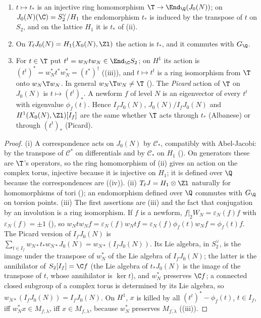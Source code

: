 \begin{proposition}\label{prop:moddeg:hecke-on-j0}
\leavevmode
\begin{enumerate}[label=(\roman*)]
\item $t\mapsto t_*$ is an injective ring homomorphism $\T\to\End_\Q(J_0(N))$; on $J_0(N)(\C)=S_2^\vee/H_1$ the endomorphism $t_*$ is induced by the transpose of $t$ on $S_2$, and on the
lattice $H_1$ it is $t_*$ of (ii).
\item On $T_\ell J_0(N)=H_1(X_0(N),\Zl)$ the action is $t_*$, and it commutes with $G_\Q$.
\item For $t\in\T$ put $t^t=w_Ntw_N\in\End_\C S_2$; on $H^1$ its action is $(t^t)^*=w_N^*t^*w_N^*=(t^*)^\dagger$ ((iii)), and $t\mapsto t^t$ is a ring isomorphism from
$\T$ onto $w_N\T w_N$. In general $w_N\T w_N\ne\T$ (). The \emph{Picard} action of $\T$ on $J_0(N)$ is $t\mapsto(t^t)_*$. A newform $f$ of level $N$ is an eigenvector of
every $t^t$ with eigenvalue $\phi_f(t)$. Hence $I_fJ_0(N)$, $J_0(N)/I_fJ_0(N)$ and $H^1(X_0(N),\Zl)[I_f]$ are the same whether $\T$ acts through $t_*$ (Albanese) or through $(t^t)_*$
(Picard).
\end{enumerate}
\end{proposition}

\begin{proof}
(i) A correspondence acts on $J_0(N)$ by $\mathcal C_*$, compatibly with Abel-Jacobi: by the transpose of $\mathcal C^*$ on differentials and by $\mathcal C_*$ on $H_1$
(). On generators these are $\T$'s operators, so the ring homomorphism of (ii) gives an action on the complex torus,
injective because it is injective on $H_1$; it is defined over $\Q$ because the correspondences are ((iv)). (ii) $T_\ell J=H_1\otimes\Zl$
naturally for homomorphisms of tori (); an endomorphism defined over $\Q$ commutes with $G_\Q$ on torsion points. (iii) The first assertions are (iii) and the fact that conjugation by an involution is a ring isomorphism. If $f$ is a newform, $f|_2W_N=\varepsilon_N(f)f$
with $\varepsilon_N(f)=\pm1$ (), so $w_Ntw_Nf=\varepsilon_N(f)w_Ntf=\varepsilon_N(f)\phi_f(t)w_Nf=\phi_f(t)f$. The Picard version of $I_fJ_0(N)$ is
$\sum_{t\in I_f}w_{N*}t_*w_{N*}J_0(N)=w_{N*}(I_fJ_0(N))$. Its Lie algebra, in $S_2^\vee$, is the image under the transpose of $w_N^*$ of the Lie algebra of $I_fJ_0(N)$; the latter is
the annihilator of $S_2[I_f]=\C f$ (the Lie algebra of $t_*J_0(N)$ is the image of the transpose of $t$, whose annihilator is $\ker t$), and $w_N^*$ preserves $\C f$; a connected
closed subgroup of a complex torus is determined by its Lie algebra, so $w_{N*}(I_fJ_0(N))=I_fJ_0(N)$. On $H^1$, $x$ is killed by all $(t^t)^*-\phi_f(t)$, $t\in I_f$, iff $w_N^*x\in M_{f,\lambda}$, iff
$x\in M_{f,\lambda}$, because $w_N^*$ preserves $M_{f,\lambda}$ ((iii)).
\end{proof}

